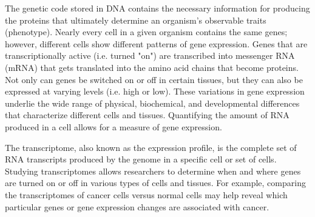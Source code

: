 The genetic code stored in DNA contains the necessary information for producing the proteins that ultimately determine an organism's observable traits (phenotype). Nearly every cell in a given organism contains the same genes; however, different cells show different patterns of gene expression. Genes that are transcriptionally active (i.e. turned "on") are transcribed into messenger RNA (mRNA) that gets translated into the amino acid chains that become proteins. Not only can genes be switched on or off in certain tissues, but they can also be expressed at varying levels (i.e. high or low). These variations in gene expression underlie the wide range of physical, biochemical, and developmental differences that characterize different cells and tissues. Quantifying the amount of RNA produced in a cell allows for a measure of gene expression. 

The transcriptome, also known as the expression profile, is the complete set of RNA transcripts produced by the genome in a specific cell or set of cells. Studying transcriptomes allows researchers to determine when and where genes are turned on or off in various types of cells and tissues. For example, comparing the transcriptomes of cancer cells versus normal cells may help reveal which particular genes or gene expression changes are associated with cancer.

